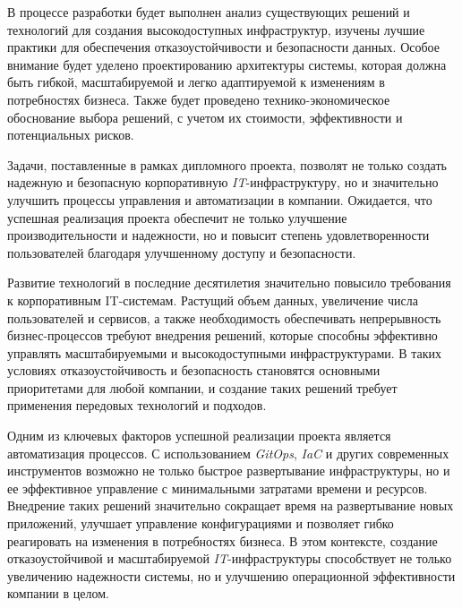 В процессе разработки будет выполнен анализ существующих решений и технологий для создания высокодоступных инфраструктур, изучены лучшие практики для обеспечения отказоустойчивости и безопасности данных. Особое внимание будет уделено проектированию архитектуры системы, которая должна быть гибкой, масштабируемой и легко адаптируемой к изменениям в потребностях бизнеса. Также будет проведено технико-экономическое обоснование выбора решений, с учетом их стоимости, эффективности и потенциальных рисков.

Задачи, поставленные в рамках дипломного проекта, позволят не только создать надежную и безопасную корпоративную \textit{IT}-инфраструктуру, но и значительно улучшить процессы управления и автоматизации в компании. Ожидается, что успешная реализация проекта обеспечит не только улучшение производительности и надежности, но и повысит степень удовлетворенности пользователей благодаря улучшенному доступу и безопасности.

Развитие технологий в последние десятилетия значительно повысило требования к корпоративным IT-системам. Растущий объем данных, увеличение числа пользователей и сервисов, а также необходимость обеспечивать непрерывность бизнес-процессов требуют внедрения решений, которые способны эффективно управлять масштабируемыми и высокодоступными инфраструктурами. В таких условиях отказоустойчивость и безопасность становятся основными приоритетами для любой компании, и создание таких решений требует применения передовых технологий и подходов.

Одним из ключевых факторов успешной реализации проекта является автоматизация процессов. С использованием \textit{GitOps}, \textit{IaC} и других современных инструментов возможно не только быстрое развертывание инфраструктуры, но и ее эффективное управление с минимальными затратами времени и ресурсов. Внедрение таких решений значительно сокращает время на развертывание новых приложений, улучшает управление конфигурациями и позволяет гибко реагировать на изменения в потребностях бизнеса. В этом контексте, создание отказоустойчивой и масштабируемой \textit{IT}-инфраструктуры способствует не только увеличению надежности системы, но и улучшению операционной эффективности компании в целом.